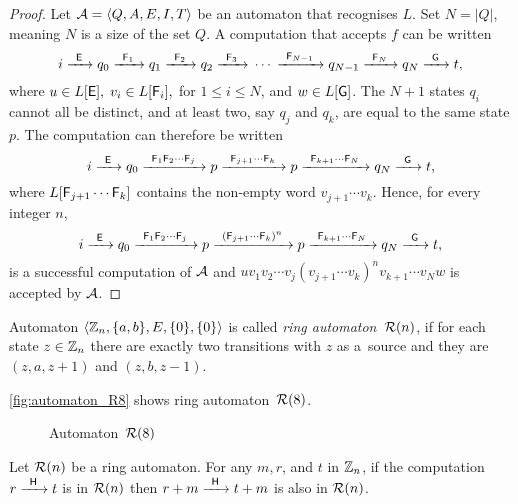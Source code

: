 \begin{proof}
    Let ${\mathcal{A}} = \langle Q, A, E, I, T \rangle$ be an automaton that recognises $L$. Set $N = |Q|$, meaning $N$ is a size of the set $Q$. A computation that accepts $f$ can be written
    \[
        i {\; \xrightarrow[]{\: \; {\mathsf{E}} \: \;} \;} q_0 {\; \xrightarrow[]{\: \; {\mathsf{F}}_1 \: \;} \;} q_1 {\; \xrightarrow[]{\: \; {\mathsf{F}}_2 \: \;} \;} q_2 {\; \xrightarrow[]{\: \; {\mathsf{F}}_3 \: \;} \;} \dotsm {\; \xrightarrow[]{\: \; {\mathsf{F}}_{N-1} \: \;} \;} q_{N-1} {\; \xrightarrow[]{\: \; {\mathsf{F}}_{N} \: \;} \;} q_N {\; \xrightarrow[]{\: \; {\mathsf{G}} \: \;} \;} t,
    \]
    where $u \in L[{\mathsf{E}}], \; v_i \in L[{\mathsf{F}}_i], $ for $ 1 \leq i \leq N$, and $w \in L[{\mathsf{G}}]$. The $N + 1$ states $q_i$ cannot all be distinct, and at least two, say $q_j$ and $q_k$, are equal to the same state $p$. The computation can therefore be written
    \[
        i {\; \xrightarrow[]{\: \; {\mathsf{E}} \: \;} \;} q_0 {\; \xrightarrow[]{\: \; {\mathsf{F}}_1 {\mathsf{F}}_2 \dotsm {\mathsf{F}}_j \: \;} \;} p {\; \xrightarrow[]{\: \; {\mathsf{F}}_{j+1} \dotsm {\mathsf{F}}_k \: \;} \;} p {\; \xrightarrow[]{\: \; {\mathsf{F}}_{k+1} \dotsm {\mathsf{F}}_N \: \;} \;} q_N {\; \xrightarrow[]{\: \; {\mathsf{G}} \: \;} \;} t,
    \]
    where $L[{\mathsf{F}}_{j+1} \dotsm {\mathsf{F}}_k]$ contains the non-empty word $v_{j+1} \dotsm v_k$. Hence, for every integer $n$,
    \[
        i {\; \xrightarrow[]{\: \; {\mathsf{E}} \: \;} \;} q_0 {\; \xrightarrow[]{\: \; {\mathsf{F}}_1 {\mathsf{F}}_2 \dotsm {\mathsf{F}}_j \: \;} \;} p {\; \xrightarrow[]{\: \; {({\mathsf{F}}_{j+1} \dotsm {\mathsf{F}}_k)}^n \: \;} \;} p {\; \xrightarrow[]{\: \; {\mathsf{F}}_{k+1} \dotsm {\mathsf{F}}_N \: \;} \;} q_N {\; \xrightarrow[]{\: \; {\mathsf{G}} \: \;} \;} t,
    \]
    is a successful computation of ${\mathcal{A}}$ and $u v_1 v_2 \dotsm v_j {(v_{j+1} \dotsm v_k)}^n v_{k+1} \dotsm v_N w$ is accepted by ${\mathcal{A}}$.
\end{proof}

\begin{defn}
    Automaton $\langle \mathbb{Z}_n, \{a,b\}, E, \{0\}, \{0\} \rangle$ is called \emph{ring automaton~${{\mathcal{R}}(n)}$}, if for each state $z \in \mathbb{Z}_n$ there are exactly two transitions with $z$ as a~source and they are $(z, a, z+1)$ and $(z, b, z-1)$.
\end{defn}

\begin{example}
    \autoref*{fig:automaton_R8} shows ring automaton~${{\mathcal{R}}(8)}$.

    \begin{figure}[h]
        \centering
        
        \caption{Automaton~${{\mathcal{R}}(8)}$}\label{fig:automaton_R8}
    \end{figure}
\end{example}

\begin{lemma}\label{lm:R_n_computation_existence}
    Let ${\mathcal{R}}(n)$ be a ring automaton. For any $m, r$, and $t$ in $\mathbb{Z}_n$, if the computation $r {\; \xrightarrow[]{\: \; {\mathsf{H}} \: \;} \;} t$ is in ${\mathcal{R}}(n)$ then $r+m {\; \xrightarrow[]{\: \; {\mathsf{H}} \: \;} \;} t+m$ is also in ${\mathcal{R}}(n)$.
\end{lemma}

